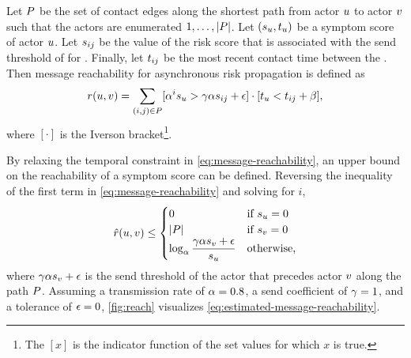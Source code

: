 Let $P$ be the set of contact edges along the shortest path from actor $u$ to actor $v$ such that the actors are enumerated $1, \ldots, \left\vert P \right\vert$. Let $(s_u, t_u)$ be a symptom score of actor $u$. Let $s_{ij}$ be the value of the risk score that is associated with the send threshold of  for . Finally, let $t_{ij}$ be the most recent contact time between the . Then message reachability for asynchronous risk propagation is defined as
\begin{equation}\label{eq:message-reachability}
  r(u, v) = \sum_{(i, j) \in P} [\alpha^i s_u > \gamma \alpha s_{ij} + \epsilon] \cdot [t_u < t_{ij} + \beta],
\end{equation}
where $[\cdot]$ is the Iverson bracket\footnote{The  $[x]$ is the indicator function of the set values for which $x$ is true.}.

By relaxing the temporal constraint in \cref{eq:message-reachability}, an upper bound on the reachability of a symptom score can be defined. Reversing the inequality of the first term in \cref{eq:message-reachability} and solving for $i$,
\begin{equation}\label{eq:estimated-message-reachability}
  \hat{r}(u, v) \leq \begin{cases} 
      0 & \text{if $s_u = 0$} \\
      \left\vert P \right\vert & \text{if $s_v = 0$} \\
      \log_\alpha \dfrac{\gamma \alpha s_v + \epsilon}{s_u} & \text{otherwise,}
    \end{cases}
\end{equation}
where $\gamma \alpha s_v + \epsilon$ is the send threshold of the actor that precedes actor $v$ along the path $P$. Assuming a transmission rate of $\alpha = 0.8$, a send coefficient of $\gamma = 1$, and a tolerance of $\epsilon = 0$, \cref{fig:reach} visualizes \cref{eq:estimated-message-reachability}.

